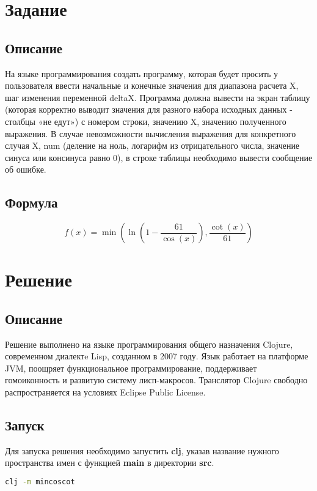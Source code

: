 \documentclass[a4paper,12pt,russian]{report}
\begin{document}


\newpage
{}

\tableofcontents

\section{Задание}

\subsection{Описание}
На языке программирования создать программу, которая будет просить у пользователя ввести начальные и конечные значения для диапазона расчета X, шаг изменения переменной deltaX. Программа должна вывести на экран таблицу (которая корректно выводит значения для разного набора исходных данных - столбцы «не едут») с номером строки, значению X, значению полученного выражения. В случае невозможности вычисления выражения для конкретного случая X, num (деление на ноль, логарифм из отрицательного числа, значение синуса или консинуса равно 0), в строке таблицы необходимо вывести сообщение об ошибке.

\subsection{Формула}
\begin{equation*}
  f(x) = \min\left(\ln\left(1-\frac{61}{\cos(x)}\right), \frac{\cot(x)}{61}\right)
\end{equation*}
\clearpage

\section{Решение}

\subsection{Описание}
Решение выполнено на языке программирования общего назначения Clojure, современном диалектe Lisp, созданном в 2007 году. Язык работает на платформе JVM, поощряет функциональное программирование, поддерживает гомоиконность и развитую систему лисп-макросов. Транслятор Clojure свободно распространяется на условиях Eclipse Public License.

\subsection{Запуск}
Для запуска решения необходимо запустить \textbf{clj}, указав название нужного пространства имен с функцией \textbf{main} в директории \textbf{src}.
\begin{lstlisting}[language=bash]
clj -m mincoscot
\end{lstlisting}
\end{document}
